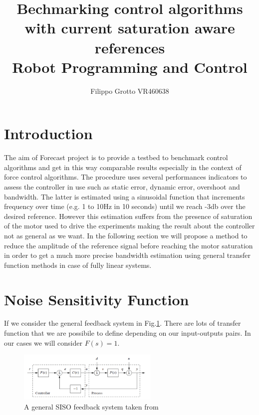 \documentclass[a4paper,11pt]{article}
\begin{document}
\author{Filippo Grotto VR460638}

\title{Bechmarking control algorithms with current saturation aware references \\[1ex] \large Robot Programming and Control}

\maketitle
\tableofcontents

\section{Introduction}
The aim of Forecast project \cite{Forecast} is to provide a testbed to benchmark control algorithms and get in this way comparable results especially in the context of force control algorithms. The procedure uses several performances indicators to assess the controller in use such as static error, dynamic error, overshoot and bandwidth. The latter is estimated using a sinusoidal function that increments frequency over time (e.g. 1 to 10Hz in 10 seconds) until we reach -3db over the desired reference. However this estimation suffers from the presence of saturation of the motor used to drive the experiments making the result about the controller not as general as we want. In the following section we will propose a method to reduce the amplitude of the reference signal before reaching the motor saturation in order to get a much more precise bandwidth estimation using general transfer function methods in case of fully linear systems.

\newpage
\section{Noise Sensitivity Function}
If we consider the general feedback system in Fig.\ref{fig:feedback}. There are lots of transfer function that we are possibile to define depending on our input-outputs pairs. In our cases we will consider $F(s)=1$. 

\begin{figure}[H]
\begin{center}
\includegraphics[width=0.6\textwidth]{images/feedback.png}
\end{center}
\caption{A general SISO feedback system taken from \cite{scientist}}
\label{fig:feedback}
\end{figure}
\end{document}
